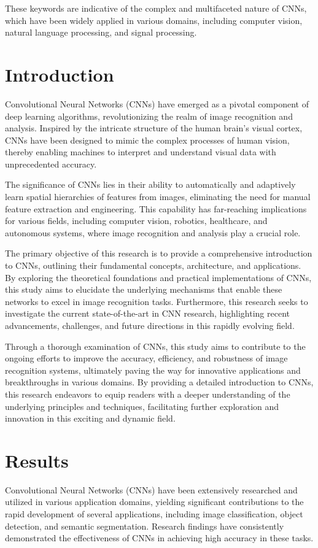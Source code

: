 \documentclass[a4paper,twocolumn]{article}%
\begin{document}
These keywords are indicative of the complex and multifaceted nature of CNNs, which have been widely applied in various domains, including computer vision, natural language processing, and signal processing.

%
\section*{Introduction}%
\label{sec:Introduction}%
Convolutional Neural Networks (CNNs) have emerged as a pivotal component of deep learning algorithms, revolutionizing the realm of image recognition and analysis. Inspired by the intricate structure of the human brain's visual cortex, CNNs have been designed to mimic the complex processes of human vision, thereby enabling machines to interpret and understand visual data with unprecedented accuracy.

The significance of CNNs lies in their ability to automatically and adaptively learn spatial hierarchies of features from images, eliminating the need for manual feature extraction and engineering. This capability has far-reaching implications for various fields, including computer vision, robotics, healthcare, and autonomous systems, where image recognition and analysis play a crucial role.

The primary objective of this research is to provide a comprehensive introduction to CNNs, outlining their fundamental concepts, architecture, and applications. By exploring the theoretical foundations and practical implementations of CNNs, this study aims to elucidate the underlying mechanisms that enable these networks to excel in image recognition tasks. Furthermore, this research seeks to investigate the current state-of-the-art in CNN research, highlighting recent advancements, challenges, and future directions in this rapidly evolving field.

Through a thorough examination of CNNs, this study aims to contribute to the ongoing efforts to improve the accuracy, efficiency, and robustness of image recognition systems, ultimately paving the way for innovative applications and breakthroughs in various domains. By providing a detailed introduction to CNNs, this research endeavors to equip readers with a deeper understanding of the underlying principles and techniques, facilitating further exploration and innovation in this exciting and dynamic field.

%
\section*{Results}%
\label{sec:Results}%
Convolutional Neural Networks (CNNs) have been extensively researched and utilized in various application domains, yielding significant contributions to the rapid development of several applications, including image classification, object detection, and semantic segmentation. Research findings have consistently demonstrated the effectiveness of CNNs in achieving high accuracy in these tasks.
\end{document}
